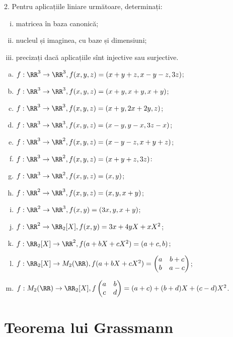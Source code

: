 2. Pentru aplicațiile liniare următoare, determinați:
\begin{enumerate}[(i)]
\item matricea în baza canonică;
\item nucleul și imaginea, cu baze și dimensiuni;
\item precizați dacă aplicațiile sînt injective sau surjective.
\end{enumerate}
\begin{enumerate}[(a)]
\item $ f : \RR^3 \to \RR^3, f(x, y, z) = (x + y + z, x - y - z, 3z) $;
\item $ f : \RR^3 \to \RR^3, f(x, y, z) = (x + y, x + y, x + y) $;
\item $ f : \RR^3 \to \RR^3, f(x, y, z) = (x + y, 2x + 2y, z) $;
\item $ f : \RR^3 \to \RR^3, f(x, y, z) = (x - y, y - x, 3z - x) $;
\item $ f : \RR^3 \to \RR^2, f(x, y, z) = (x - y - z, x + y + z) $;
\item $ f : \RR^3 \to \RR^2, f(x, y, z) = (x + y + z, 3z) $:
\item $ f : \RR^3 \to \RR^2, f(x, y, z) = (x, y) $;
\item $ f : \RR^2 \to \RR^3, f(x, y, z) = (x, y, x + y) $;
\item $ f : \RR^2 \to \RR^3, f(x, y) = (3x, y, x + y) $;
\item $ f : \RR^2 \to \RR_2[X], f(x, y) = 3x + 4yX + xX^2 $;
\item $ f : \RR_2[X] \to \RR^2, f(a + bX + cX^2) = (a + c, b) $;
\item $ f : \RR_2[X] \to M_2(\RR), f(a + bX + cX^2) = %
  \begin{pmatrix}
    a & b + c \\
    b & a - c
  \end{pmatrix}$;
\item $ f : M_2(\RR) \to \RR_2[X], f \begin{pmatrix} a & b \\ c & d \end{pmatrix} = %
  (a + c) + (b + d)X + (c - d)X^2 $.
\end{enumerate}



\section{Teorema lui Grassmann}

